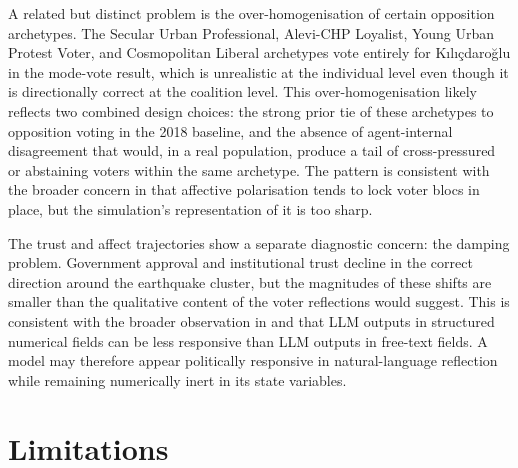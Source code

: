 \documentclass[12pt,a4paper]{report}
\begin{document}
A related but distinct problem is the over-homogenisation of certain opposition archetypes. The Secular Urban Professional, Alevi-CHP Loyalist, Young Urban Protest Voter, and Cosmopolitan Liberal archetypes vote entirely for Kılıçdaroğlu in the mode-vote result, which is unrealistic at the individual level even though it is directionally correct at the coalition level. This over-homogenisation likely reflects two combined design choices: the strong prior tie of these archetypes to opposition voting in the 2018 baseline, and the absence of agent-internal disagreement that would, in a real population, produce a tail of cross-pressured or abstaining voters within the same archetype. The pattern is consistent with the broader concern in \citet{aytac2025polarised} that affective polarisation tends to lock voter blocs in place, but the simulation's representation of it is too sharp.

The trust and affect trajectories show a separate diagnostic concern: the damping problem. Government approval and institutional trust decline in the correct direction around the earthquake cluster, but the magnitudes of these shifts are smaller than the qualitative content of the voter reflections would suggest. This is consistent with the broader observation in \citet{ziems2024css} and \citet{qu2024performance} that LLM outputs in structured numerical fields can be less responsive than LLM outputs in free-text fields. A model may therefore appear politically responsive in natural-language reflection while remaining numerically inert in its state variables.

\section{Limitations}
\label{sec:limitations}
\end{document}
